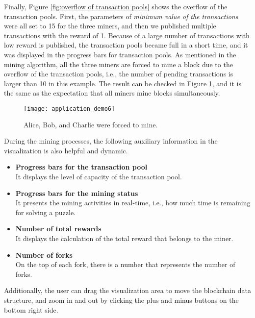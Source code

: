 Finally, Figure \ref{fig:overflow of transaction pools} shows the overflow of the transaction pools. First, the parameters of \textit{minimum value of the transactions} were all set to 15 for the three miners, and then we published multiple transactions with the reward of 1. Because of a large number of transactions with low reward is published, the transaction pools became full in a short time, and it was displayed in the progress bars for transaction pools. As mentioned in the mining algorithm, all the three miners are forced to mine a block due to the overflow of the transaction pools, i.e., the number of pending transactions is larger than 10 in this example. The result can be checked in Figure \ref{fig:alice, bob, and charlie were forced to mine}, and it is the same as the expectation that all miners mine blocks simultaneously.

\begin{figure}[htb]
    \centering
    \texttt{[image: application\_demo6]}
    \caption{Alice, Bob, and Charlie were forced to mine.}
    \label{fig:alice, bob, and charlie were forced to mine}
\end{figure}

\clearpage

During the mining processes, the following auxiliary information in the visualization is also helpful and dynamic.

\begin{itemize}
    \item \textbf{Progress bars for the transaction pool} \\
        It displays the level of capacity of the transaction pool.
    \item \textbf{Progress bars for the mining status} \\
        It presents the mining activities in real-time, i.e., how much time is remaining for solving a puzzle.
    \item \textbf{Number of total rewards} \\
        It displays the calculation of the total reward that belongs to the miner.
    \item \textbf{Number of forks} \\
        On the top of each fork, there is a number that represents the number of forks.
\end{itemize}

Additionally, the user can drag the visualization area to move the blockchain data structure, and zoom in and out by clicking the plus and minus buttons on the bottom right side.

